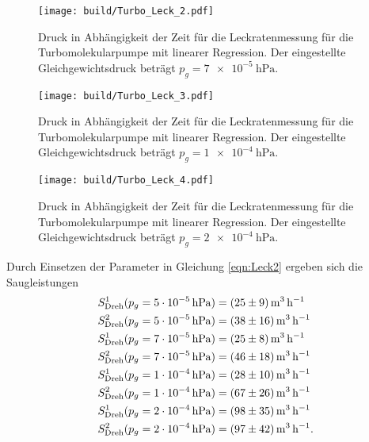 \noindent
\begin{figure}[H]
    \centering
    \texttt{[image: build/Turbo\_Leck\_2.pdf]}
    \caption{Druck in Abhängigkeit der Zeit für die Leckratenmessung für die Turbomolekularpumpe mit linearer Regression. Der eingestellte Gleichgewichtsdruck beträgt $p_g=\SI{7e-5}{\hecto\pascal}$.}
    \label{fig:turbo_leck2}
\end{figure}
\noindent
\begin{figure}[H]
    \centering
    \texttt{[image: build/Turbo\_Leck\_3.pdf]}
    \caption{Druck in Abhängigkeit der Zeit für die Leckratenmessung für die Turbomolekularpumpe mit linearer Regression. Der eingestellte Gleichgewichtsdruck beträgt $p_g=\SI{1e-4}{\hecto\pascal}$.}
    \label{fig:turbo_leck3}
\end{figure}
\noindent
\begin{figure}[H]
    \centering
    \texttt{[image: build/Turbo\_Leck\_4.pdf]}
    \caption{Druck in Abhängigkeit der Zeit für die Leckratenmessung für die Turbomolekularpumpe mit linearer Regression. Der eingestellte Gleichgewichtsdruck beträgt $p_g=\SI{2e-4}{\hecto\pascal}$.}
    \label{fig:turbo_leck4}
\end{figure}
\noindent
Durch Einsetzen der Parameter in Gleichung \ref{eqn:Leck2} ergeben sich die Saugleistungen 
\begin{align*}
  S^1_\text{Dreh}(p_g=\SI{5e-5}{\hecto\pascal})&=\SI[per-mode=reciprocal]{25 \pm 9}{\cubic\metre\per\hour}\\
  S^2_\text{Dreh}(p_g=\SI{5e-5}{\hecto\pascal})&=\SI[per-mode=reciprocal]{38 \pm 16}{\cubic\metre\per\hour}\\
  S^1_\text{Dreh}(p_g=\SI{7e-5}{\hecto\pascal})&=\SI[per-mode=reciprocal]{25 \pm 8}{\cubic\metre\per\hour}\\
  S^2_\text{Dreh}(p_g=\SI{7e-5}{\hecto\pascal})&=\SI[per-mode=reciprocal]{46 \pm 18}{\cubic\metre\per\hour}\\
  S^1_\text{Dreh}(p_g=\SI{1e-4}{\hecto\pascal})&=\SI[per-mode=reciprocal]{28 \pm 10}{\cubic\metre\per\hour}\\
  S^2_\text{Dreh}(p_g=\SI{1e-4}{\hecto\pascal})&=\SI[per-mode=reciprocal]{67 \pm 26}{\cubic\metre\per\hour}\\
  S^1_\text{Dreh}(p_g=\SI{2e-4}{\hecto\pascal})&=\SI[per-mode=reciprocal]{98 \pm 35}{\cubic\metre\per\hour}\\
  S^2_\text{Dreh}(p_g=\SI{2e-4}{\hecto\pascal})&=\SI[per-mode=reciprocal]{97 \pm 42}{\cubic\metre\per\hour}.
\end{align*}